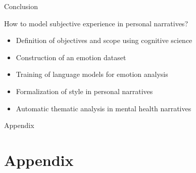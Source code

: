 \documentclass[10pt]{beamer}
\begin{document}
\begin{frame}{Conclusion}

How to model subjective experience in personal narratives?

\vspace{0.5cm}
\pause

\begin{itemize}[<+->]
    \item Definition of objectives and scope using cognitive science
    \item Construction of an emotion dataset 
    \item Training of language models for emotion analysis 
    \item Formalization of style in personal narratives
    \item Automatic thematic analysis in mental health narratives%
\end{itemize}



    
\end{frame}

\begin{frame}{}
\Large
\begin{center}
    Appendix
    \section{Appendix}
\end{center}

\end{frame}
\end{document}
